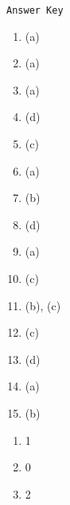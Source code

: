 \begin{center}
\texttt{Answer Key}
\begin{multicols}{5}
\begin{enumerate}
\item (a)
\item (a)
\item (a)
\item (d)
\item (c)
\item (a)
\item (b)
\item (d)
\item (a)
\item (c)
\item (b), (c)
\item (c)
\item (d)
\item (a)
\item (b)
\end{enumerate}
\begin{enumerate}\addtocounter{enumi}{15}
\item 1
\item 0
\item 2
\end{enumerate}
\end{multicols}
\end{center}
